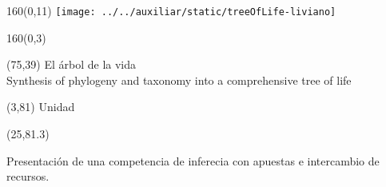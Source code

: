 \documentclass[shownotes,aspectratio=169]{beamer}
\newcounter{capitulo}
\newcommand{\unidad}{\thecapitulo \stepcounter{capitulo}}
\begin{document}
\begin{frame}
\end{frame}


\begin{frame}

\begin{textblock}{160}(0,11)  \centering
\texttt{[image: ../../auxiliar/static/treeOfLife-liviano]}
\end{textblock}

\begin{textblock}{160}(0,3) \centering
\LARGE \textcolor{black!85}{}
\end{textblock}



\begin{textblock}{55}(75,39)
\textcolor{black!85}{\normalsize El árbol de la vida \\
\fontsize{2}{0}\selectfont Synthesis of phylogeny and taxonomy into a comprehensive tree of life \\}
\end{textblock}


\begin{textblock}{55}(3,81)
\textcolor{black!85}{Unidad \unidad}
\end{textblock}

\begin{textblock}{55}(25,81.3)
\begin{turn}{0}
\parbox{15cm}{\small \textcolor{black!85}{Presentación de una competencia de inferecia con apuestas e intercambio de recursos.}
}
\end{turn}
\end{textblock}

\end{frame}
\end{document}

